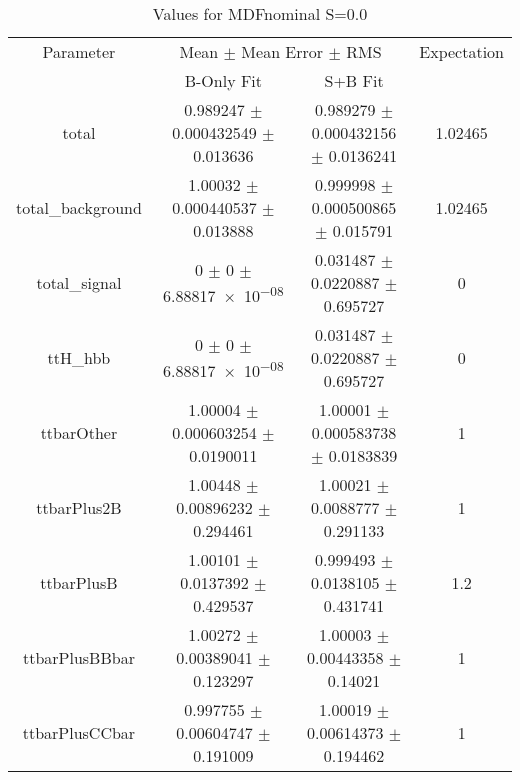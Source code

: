 \begin{table}
\centering
\caption{Values for MDFnominal S=0.0}
\begin{tabular}{cccc}
\toprule
Parameter & \multicolumn{2}{c}{Mean $\pm$ Mean Error $\pm$ RMS} & Expectation\\
 & B-Only Fit & S+B Fit & \\
\midrule
total & \num{0.989247} $\pm$ \num{0.000432549} $\pm$ \num{0.013636} & \num{0.989279} $\pm$ \num{0.000432156} $\pm$ \num{0.0136241} & \num{1.02465}\\
total\_background & \num{1.00032} $\pm$ \num{0.000440537} $\pm$ \num{0.013888} & \num{0.999998} $\pm$ \num{0.000500865} $\pm$ \num{0.015791} & \num{1.02465}\\
total\_signal & \num{0} $\pm$ \num{0} $\pm$ \num{6.88817e-08} & \num{0.031487} $\pm$ \num{0.0220887} $\pm$ \num{0.695727} & \num{0}\\
ttH\_hbb & \num{0} $\pm$ \num{0} $\pm$ \num{6.88817e-08} & \num{0.031487} $\pm$ \num{0.0220887} $\pm$ \num{0.695727} & \num{0}\\
ttbarOther & \num{1.00004} $\pm$ \num{0.000603254} $\pm$ \num{0.0190011} & \num{1.00001} $\pm$ \num{0.000583738} $\pm$ \num{0.0183839} & \num{1}\\
ttbarPlus2B & \num{1.00448} $\pm$ \num{0.00896232} $\pm$ \num{0.294461} & \num{1.00021} $\pm$ \num{0.0088777} $\pm$ \num{0.291133} & \num{1}\\
ttbarPlusB & \num{1.00101} $\pm$ \num{0.0137392} $\pm$ \num{0.429537} & \num{0.999493} $\pm$ \num{0.0138105} $\pm$ \num{0.431741} & \num{1.2}\\
ttbarPlusBBbar & \num{1.00272} $\pm$ \num{0.00389041} $\pm$ \num{0.123297} & \num{1.00003} $\pm$ \num{0.00443358} $\pm$ \num{0.14021} & \num{1}\\
ttbarPlusCCbar & \num{0.997755} $\pm$ \num{0.00604747} $\pm$ \num{0.191009} & \num{1.00019} $\pm$ \num{0.00614373} $\pm$ \num{0.194462} & \num{1}\\
\bottomrule
\end{tabular}
\end{table}